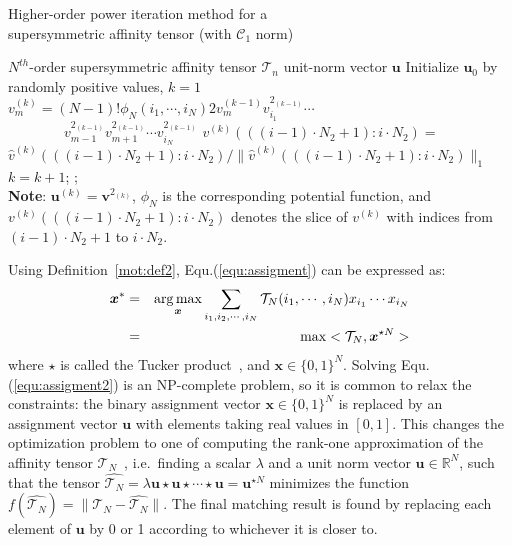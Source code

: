 \begin{algorithm}[!t]
\caption{\small Higher-order power iteration method for a \protect\\
         \mbox{}\hspace{15ex}\small supersymmetric affinity tensor (with $\mathcal{C}_1$ norm)}
\label{alg2}
\begin{algorithmic}[1]
\REQUIRE \small $N^{th}$-order supersymmetric affinity tensor $\mathcal{T}_n$
\ENSURE  \small unit-norm vector $\boldsymbol{u}$
\STATE   \small \; Initialize $\boldsymbol{u}_0$ by randomly positive values, $k=1$
\REPEAT
        \STATE $v_{m}^{(k)}=(N-1)!\phi_N(i_1,\cdots , i_N) 2v_{m}^{(k-1)}v_{i_1}^{2_{(k-1)}}\cdots$ \\
                 $\qquad \qquad v_{m-1}^{2_{(k-1)}}v_{m+1}^{2_{(k-1)}}\cdots v_{i_N}^{2_{(k-1)}}$
        \ENDFOR
        \STATE $v^{(k)}(((i-1)\cdot N_2+1) : i\cdot N_2)=$   \protect\\
               $\hat{v}^{(k)}(((i-1)\cdot N_2+1) : i\cdot N_2)/\lVert \hat{v}^{(k)}(((i-1)\cdot N_2+1):i\cdot N_2)\lVert_1$
        \ENDFOR
    \ENDFOR
    \STATE $k=k+1$;
;\protect\\
       \small \textbf{Note}: $\boldsymbol{u}^{(k)}=\boldsymbol{v}^{2_{(k)}}$, $\phi_N$ is the corresponding potential function, 
       \small and $v^{(k)}(((i-1)\cdot N_2+1) : i\cdot N_2)$ denotes the slice of $v^{(k)}$ with
       \small indices from $(i-1)\cdot N_2+1$ to $i\cdot N_2$.
\end{algorithmic}
\end{algorithm}

Using Definition~\ref{mot:def2}, Equ.(\ref{equ:assigment}) can be expressed as:
\begin{eqnarray}
\label{equ:assigment2}
{\boldsymbol{x}}^* &=& \operatorname*{arg\,max}_{\boldsymbol{x}} \sum_{i_1,i_2,\cdots,i_N} \mathcal{T}_N(i_1,\cdots,i_N) x_{i_1} \cdots x_{i_N} \nonumber\\
&=& \max <\mathcal{T}_N, \boldsymbol{x}^{\star N}>
\end{eqnarray}
where $\star$ is called the Tucker product~\cite{Kofidis02}, and $\boldsymbol{x} \in \{0,1\}^{N}$.
Solving Equ.(\ref{equ:assigment2}) is an NP-complete problem,
so it is common to relax the constraints:
the binary assignment vector $\boldsymbol{x}\in \{0,1\}^{N}$ is replaced by an assignment vector $\boldsymbol{u}$ with elements taking real values in $[0,1]$.
This changes the optimization problem to one of computing the rank-one approximation of the affinity tensor $\mathcal{T}_N$~\cite{Kofidis02},
i.e.\ finding a scalar $\lambda$ and a unit norm vector $\boldsymbol{u}\in \mathbb{R}^{N}$,
such that the tensor $\hat{\mathcal{T}_N} = \lambda \boldsymbol{u}\star \boldsymbol{u} \star\cdots \star \boldsymbol{u}=\boldsymbol{u}^{\star N}$ minimizes the function $f(\hat{\mathcal{T}_N})=\lVert \mathcal{T}_N-\hat{\mathcal{T}_N} \lVert$.
The final matching result is found by replacing each element of $\boldsymbol{u}$ by 0 or 1 according to whichever it is closer to.

